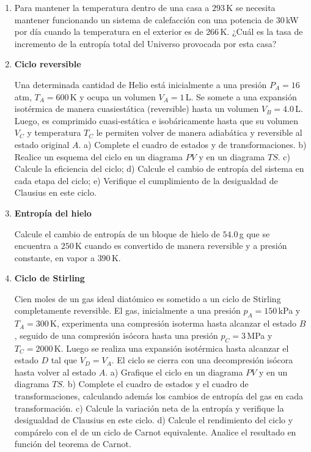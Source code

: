 \documentclass[a4paper,12pt]{article}
\begin{document}
\begin{enumerate}
	\item {}

		Para mantener la temperatura dentro de una casa a $293$\,K se necesita
		mantener funcionando un sistema de calefacción con una potencia de
		$30$\,kW por día cuando la temperatura en el exterior es de $266$\,K.
		¿Cuál es la tasa de incremento de la entropía total del Universo
		provocada por esta casa?

	\item {\bf{Ciclo reversible}}

		Una determinada cantidad de Helio está inicialmente a una presión
		$P_A=16$\,atm, $T_A=600$\,K y ocupa un volumen $V_A=1$\,L. Se somete a
		una expansión isotérmica de manera cuasiestática (reversible) hasta un
		volumen $V_B=4.0$\,L. Luego, es comprimido cuasi-estática e
		isobáricamente hasta que su volumen $V_C$ y temperatura $T_C$ le
		permiten volver de manera adiabática y reversible al estado original
		$A$. a) Complete el cuadro de estados y de transformaciones. b) Realice
		un esquema del ciclo en un diagrama $PV$ y en un diagrama $TS$. c)
		Calcule la eficiencia del ciclo; d) Calcule el cambio de entropía del
		sistema en cada etapa del ciclo; e) Verifique el cumplimiento de la
		desigualdad de Clausius en este ciclo.

	\item {\bf{Entropía del hielo}}

		Calcule el cambio de entropía de un bloque de hielo de $54.0$\,g que se
		encuentra a $250$\,K cuando es convertido de manera reversible y a
		presión constante, en vapor a $390$\,K.

	\item {\bf{Ciclo de Stirling}}

		Cien moles de un gas ideal diatómico es sometido a un ciclo de Stirling
		completamente reversible. El gas, inicialmente a una presión
		$p_A=150$\,kPa y $T_A=300$\,K, experimenta una compresión isoterma
		hasta alcanzar el estado $B$, seguido de una compresión isócora hasta
		una presión $p_C=3$\,MPa y $T_C=2000$\,K. Luego se realiza una
		expansión isotérmica hasta alcanzar el estado $D$ tal que $V_D=V_A$. El
		ciclo se cierra con una decompresión isócora hasta volver al estado
		$A$. a) Grafique el ciclo en un diagrama $PV$ y en un diagrama $TS$. b)
		Complete el cuadro de estados y el cuadro de transformaciones,
		calculando además los cambios de entropía del gas en cada
		transformación. c) Calcule la variación neta de la entropía y verifique
		la desigualdad de Clausius en este ciclo. d) Calcule el rendimiento del
		ciclo y compárelo con el de un ciclo de Carnot equivalente. Analice el
		resultado en función del teorema de Carnot. 


\end{enumerate}
\end{document}
